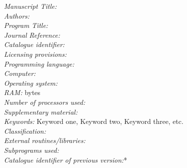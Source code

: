\documentclass[preprint,12pt]{elsarticle}
\newcounter{bla}
\begin{document}
\begin{small}
\noindent
{\em Manuscript Title:}                                       \\
{\em Authors:}                                                \\
{\em Program Title:}                                          \\
{\em Journal Reference:}                                      \\
{\em Catalogue identifier:}                                   \\
{\em Licensing provisions:}                                   \\
{\em Programming language:}                                   \\
{\em Computer:}                                               \\
{\em Operating system:}                                       \\
{\em RAM:} bytes                                              \\
{\em Number of processors used:}                              \\
{\em Supplementary material:}                                 \\
{\em Keywords:} Keyword one, Keyword two, Keyword three, etc.  \\
{\em Classification:}                                         \\
{\em External routines/libraries:}                            \\
{\em Subprograms used:}                                       \\
{\em Catalogue identifier of previous version:}*              \\

\end{small}
\end{document}
